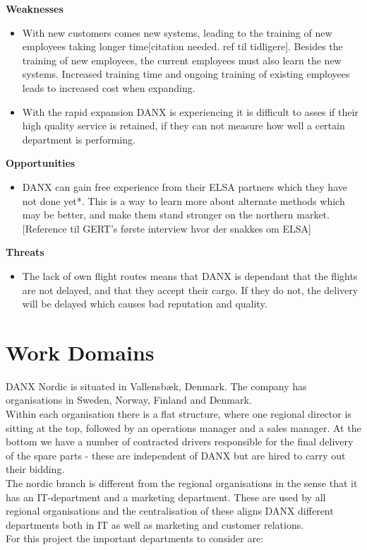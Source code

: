 \textbf{Weaknesses}
\begin{itemize}
\item With new customers comes new systems, leading to the training of new employees taking longer time[citation needed. ref til tidligere]. Besides the training of new employees, the current employees must also learn the new systems. Increased training time and ongoing training of existing employees leads to increased cost when expanding.
\item With the rapid expansion DANX is experiencing it is difficult to asses if their high quality service is retained, if they can not measure how well a certain department is performing.
\end{itemize}

\textbf{Opportunities}
\begin{itemize}
\item DANX can gain free experience from their ELSA partners which they have not done yet*. This is a way to learn more about alternate methods which may be better, and make them stand stronger on the northern market. [Reference til GERT’s første interview hvor der snakkes om ELSA]
\end{itemize}

\textbf{Threats}
\begin{itemize}
\item The lack of own flight routes means that DANX is dependant that the flights are not delayed, and that they accept their cargo. If they do not, the delivery will be delayed which causes bad reputation and quality.
\end{itemize}

\section{Work Domains}
DANX Nordic is situated in Vallensbæk, Denmark. The company has organisations in Sweden, Norway, Finland and Denmark.\\
Within each organisation there is a flat structure, where one regional director is sitting at the top, followed by an operations manager and a sales manager. At the bottom we have a number of contracted drivers responsible for the final delivery of the spare parts - these are independent of DANX but are hired to carry out their bidding.\\
The nordic branch is different from the regional organisations in the sense that it has an IT-department and a marketing department. These are used by all regional organisations and the centralisation of these aligns DANX different departments both in IT as well as marketing and customer relations.\\
For this project the important departments to consider are:

